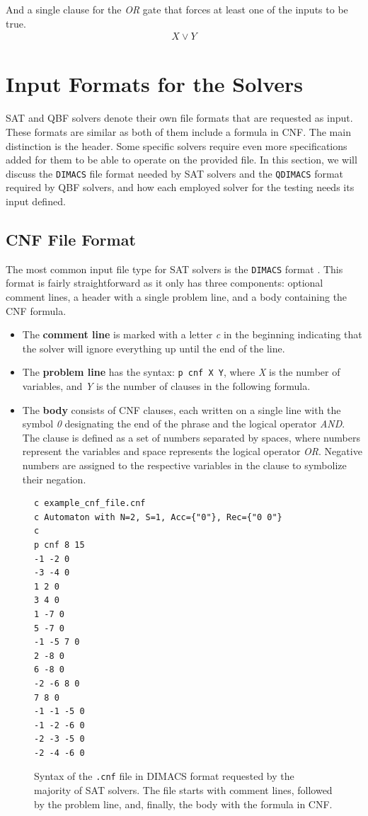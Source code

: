And a single clause for the \textit{OR} gate that forces at least one of the inputs to be true.
\begin{align*}
    X \lor Y
\end{align*}


\section{Input Formats for the Solvers}
\label{sec:input_solvers}
SAT and QBF solvers denote their own file formats that are requested as input. These formats are similar as both of them include a formula in CNF. The main distinction is the header. Some specific solvers require even more specifications added for them to be able to operate on the provided file. In this section, we will discuss the \texttt{DIMACS} file format needed by SAT solvers and the \texttt{QDIMACS} format required by QBF solvers, and how each employed solver for the testing needs its input defined.

\subsection{CNF File Format}
The most common input file type for SAT solvers is the \verb|DIMACS| format \cite{DIMACS_page}. This format is fairly straightforward as it only has three components: optional comment lines, a header with a single problem line, and a body containing the CNF formula.
\begin{itemize}
    \item The \textbf{comment line} is marked with a letter \emph{c} in the beginning indicating that the solver will ignore everything up until the end of the line.
    \item The \textbf{problem line} has the syntax: \texttt{p cnf X Y}, where \emph{X} is the number of variables, and \emph{Y} is the number of clauses in the following formula. 
    \item The \textbf{body} consists of CNF clauses, each written on a single line with the symbol \emph{0} designating the end of the phrase and the logical operator \textit{AND}. The clause is defined as a set of numbers separated by spaces, where numbers represent the variables and space represents the logical operator \textit{OR}. Negative numbers are assigned to the respective variables in the clause to symbolize their negation.
\end{itemize}

\begin{figure}[ht]
\label{fig:cnf_example}
\begin{verbatim}
c example_cnf_file.cnf
c Automaton with N=2, S=1, Acc={"0"}, Rec={"0 0"}
c
p cnf 8 15
-1 -2 0
-3 -4 0
1 2 0
3 4 0
1 -7 0
5 -7 0
-1 -5 7 0
2 -8 0
6 -8 0
-2 -6 8 0
7 8 0
-1 -1 -5 0
-1 -2 -6 0
-2 -3 -5 0
-2 -4 -6 0
\end{verbatim}
\caption{Syntax of the \texttt{.cnf} file in DIMACS format requested by the majority of SAT solvers. The file starts with comment lines, followed by the problem line, and, finally, the body with the formula in CNF.}
\end{figure}


